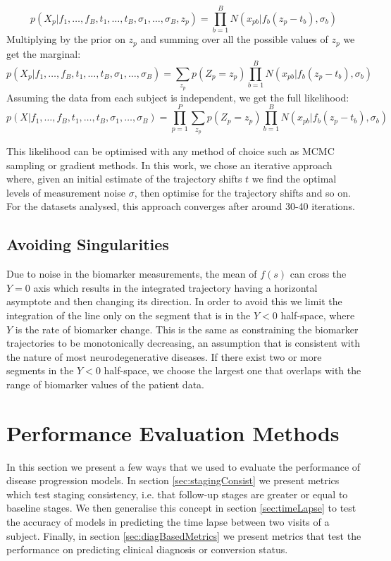 $$p(X_p| f_1,\dots, f_B, t_1, \dots, t_B, \sigma_1, \dots , \sigma_B, z_p ) = \prod_{b=1}^{B}  N(x_{pb}|f_b(z_p-t_b), \sigma_b)$$
Multiplying by the prior on $z_p$ and summing over all the possible values of $z_p$ we get the marginal:
$$p(X_p| f_1,\dots, f_B, t_1, \dots, t_B, \sigma_1, \dots , \sigma_B) = \sum_{z_p} p(Z_p = z_p) \prod_{b=1}^{B}  N(x_{pb}|f_b(z_p-t_b), \sigma_b)$$
Assuming the data from each subject is independent, we get the full likelihood:
$$ p(X| f_1,\dots, f_B, t_1, \dots, t_B, \sigma_1, \dots , \sigma_B) = \prod_{p=1}^{P} \sum_{z_p} p(Z_p = z_p) \prod_{b=1}^{B}  N(x_{pb}|f_b(z_p-t_b), \sigma_b)$$

This likelihood can be optimised with any method of choice such as MCMC sampling or gradient methods. In this work, we chose an iterative approach where, given an initial estimate of the trajectory shifts $t$ we find the optimal levels of measurement noise $\sigma$,  then optimise for the trajectory shifts and so on. For the datasets analysed, this approach converges after around 30-40 iterations.

\subsection{Avoiding Singularities}
\label{sec:demSingularity}

Due to noise in the biomarker measurements, the mean of $f(s)$ can cross the $Y=0$ axis which results in the integrated trajectory having a horizontal asymptote and then changing its direction. In order to avoid this we limit the integration of the line only on the segment that is in the $Y<0$ half-space, where $Y$ is the rate of biomarker change. This is the same as constraining the biomarker trajectories to be monotonically decreasing, an assumption that is consistent with the nature of most neurodegenerative diseases. If there exist two or more segments in the $Y<0$ half-space, we choose the largest one that overlaps with the range of biomarker values of the patient data. 

\section{Performance Evaluation Methods}
\label{sec:perfEvalMethds}

In this section we present a few ways that we used to evaluate the performance of disease progression models. In section \ref{sec:stagingConsist} we present metrics which test staging consistency, i.e. that follow-up stages are greater or equal to baseline stages. We then generalise this concept in section \ref{sec:timeLapse} to test the accuracy of models in predicting the time lapse between two visits of a subject. Finally, in section \ref{sec:diagBasedMetrics} we present metrics that test the performance on predicting clinical diagnosis or conversion status.

